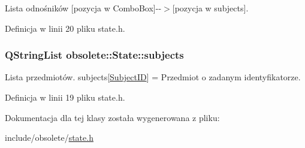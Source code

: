 Lista odnośników \mbox{[}pozycja w ComboBox\mbox{]}-\/-\/$>$\mbox{[}pozycja w subjects\mbox{]}. 



Definicja w linii 20 pliku state.h.

\hypertarget{classobsolete_1_1State_aeaa49570838d7cd7bb5585385df92b1c}{
\subsubsection[{subjects}]{\setlength{\rightskip}{0pt plus 5cm}QStringList {\bf obsolete::State::subjects}}}
\label{classobsolete_1_1State_aeaa49570838d7cd7bb5585385df92b1c}


Lista przedmiotów. subjects\mbox{[}\hyperlink{classobsolete_1_1SubjectID}{SubjectID}\mbox{]} = Przedmiot o zadanym identyfikatorze. 



Definicja w linii 19 pliku state.h.



Dokumentacja dla tej klasy została wygenerowana z pliku:\begin{DoxyCompactItemize}
\item 
include/obsolete/\hyperlink{state_8h}{state.h}\end{DoxyCompactItemize}
